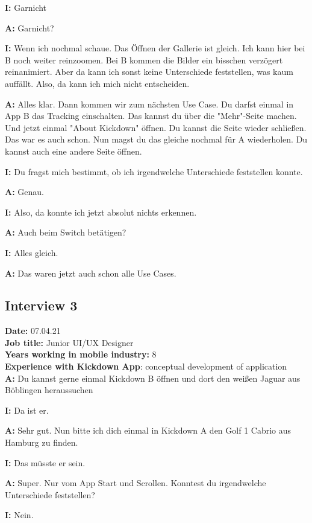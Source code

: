 \begin{myparindent}{0pt}
\textbf{I:} Garnicht

\textbf{A:} Garnicht?

\textbf{I:} Wenn ich nochmal schaue. Das Öffnen der Gallerie ist gleich. Ich kann hier bei B noch weiter reinzoomen. Bei B kommen die Bilder ein bisschen verzögert reinanimiert. Aber da kann ich sonst keine Unterschiede feststellen, was kaum auffällt. Also, da kann ich mich nicht entscheiden.

\textbf{A:} Alles klar. Dann kommen wir zum nächsten Use Case. Du darfst einmal in App B das Tracking einschalten. Das kannst du über die "Mehr"-Seite machen. Und jetzt einmal "About Kickdown" öffnen. Du kannst die Seite wieder schließen. Das war es auch schon. Nun magst du das gleiche nochmal für A wiederholen. Du kannst auch eine andere Seite öffnen.

\textbf{I:} Du fragst mich bestimmt, ob ich irgendwelche Unterschiede feststellen konnte.

\textbf{A:} Genau. 

\textbf{I:} Also, da konnte ich jetzt absolut nichts erkennen.

\textbf{A:} Auch beim Switch betätigen?

\textbf{I:} Alles gleich.

\textbf{A:} Das waren jetzt auch schon alle Use Cases.


\subsection{Interview 3}
\textbf{Date:} 07.04.21\\
\textbf{Job title:} Junior UI/UX Designer\\
\textbf{Years working in mobile industry:} 8\\
\textbf{Experience with Kickdown App}: conceptual development of application\\

\textbf{A:} Du kannst gerne einmal Kickdown B öffnen und dort den weißen Jaguar aus Böblingen heraussuchen 

\textbf{I:} Da ist er. 

\textbf{A:} Sehr gut. Nun bitte ich dich einmal in Kickdown A den Golf 1 Cabrio aus Hamburg zu finden. 

\textbf{I:} Das müsste er sein. 

\textbf{A:} Super. Nur vom App Start und Scrollen. Konntest du irgendwelche Unterschiede feststellen?

\textbf{I:} Nein.


\end{myparindent}
